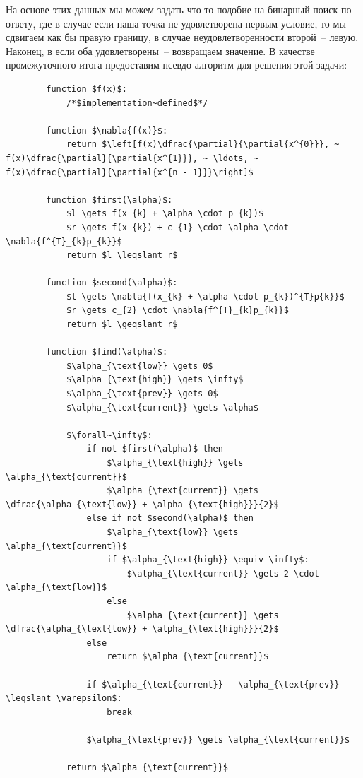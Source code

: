 \documentclass[12pt, a4paper, oneside, final]{article}
\begin{document}
	На основе этих данных мы можем задать что-то подобие на бинарный поиск по ответу, где в случае если наша точка не удовлетворена первым условие, то мы сдвигаем как бы правую границу, в случае неудовлетворенности второй~-- левую. Наконец, в если оба удовлетворены~-- возвращаем значение. В качестве промежуточного итога предоставим псевдо-алгоритм для решения этой задачи:
	\begin{lstlisting}
		function $f(x)$:
			/*$implementation~defined$*/
		
		function $\nabla{f(x)}$:
			return $\left[f(x)\dfrac{\partial}{\partial{x^{0}}}, ~ f(x)\dfrac{\partial}{\partial{x^{1}}}, ~ \ldots, ~ f(x)\dfrac{\partial}{\partial{x^{n - 1}}}\right]$

		function $first(\alpha)$:
			$l \gets f(x_{k} + \alpha \cdot p_{k})$
			$r \gets f(x_{k}) + c_{1} \cdot \alpha \cdot \nabla{f^{T}_{k}p_{k}}$
			return $l \leqslant r$

		function $second(\alpha)$:
			$l \gets \nabla{f(x_{k} + \alpha \cdot p_{k})^{T}p{k}}$
			$r \gets c_{2} \cdot \nabla{f^{T}_{k}p_{k}}$
			return $l \geqslant r$

		function $find(\alpha)$:
			$\alpha_{\text{low}} \gets 0$
			$\alpha_{\text{high}} \gets \infty$
			$\alpha_{\text{prev}} \gets 0$
			$\alpha_{\text{current}} \gets \alpha$

			$\forall~\infty$:
				if not $first(\alpha)$ then
					$\alpha_{\text{high}} \gets \alpha_{\text{current}}$
					$\alpha_{\text{current}} \gets \dfrac{\alpha_{\text{low}} + \alpha_{\text{high}}}{2}$
				else if not $second(\alpha)$ then
					$\alpha_{\text{low}} \gets \alpha_{\text{current}}$
					if $\alpha_{\text{high}} \equiv \infty$:
						$\alpha_{\text{current}} \gets 2 \cdot \alpha_{\text{low}}$
					else
						$\alpha_{\text{current}} \gets \dfrac{\alpha_{\text{low}} + \alpha_{\text{high}}}{2}$
				else
					return $\alpha_{\text{current}}$

				if $\alpha_{\text{current}} - \alpha_{\text{prev}} \leqslant \varepsilon$:
					break

				$\alpha_{\text{prev}} \gets \alpha_{\text{current}}$

			return $\alpha_{\text{current}}$
	\end{lstlisting}
\end{document}
